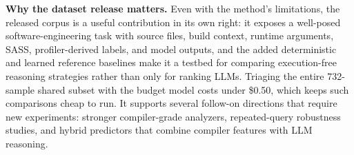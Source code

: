 \noindent\textbf{Why the dataset release matters.}
Even with the method's limitations, the released corpus is a useful contribution in its own right: it exposes a well-posed software-engineering task with source files, build context, runtime arguments, SASS, profiler-derived labels, and model outputs, and the added deterministic and learned reference baselines make it a testbed for comparing execution-free reasoning strategies rather than only for ranking LLMs.
Triaging the entire 732-sample shared subset with the budget model costs under \$0.50, which keeps such comparisons cheap to run.
It supports several follow-on directions that require new experiments: stronger compiler-grade analyzers, repeated-query robustness studies, and hybrid predictors that combine compiler features with LLM reasoning.
